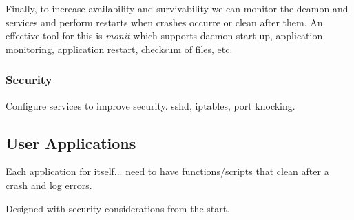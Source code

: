 Finally, to increase availability and survivability we can monitor the deamon and services and perform restarts when crashes occurre or clean after them. An effective tool for this is \textit{monit} \cite{monit} which supports daemon start up, application monitoring, application restart, checksum of files, etc.


\subsubsection{Security}

Configure services to improve security. sshd, iptables, port knocking.


\subsection{User Applications}

Each application for itself... need to have functions/scripts that clean after a crash and log errors.

Designed with security considerations from the start.
